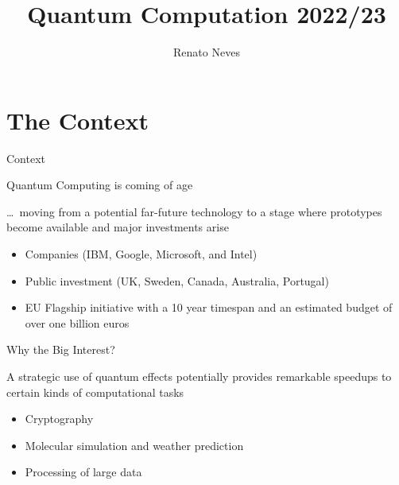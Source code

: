 \documentclass{beamer}
\author[Renato Neves]{Renato Neves}
\date{}
\begin{document}
\title{Quantum Computation 2022/23}

\frame[plain]{\titlepage}

\section{The Context}

\begin{frame}{Context}

  Quantum Computing is coming of age

  \dots\ moving from a potential far-future technology
  to a stage where prototypes become available and
  \alert{major investments} arise
  \begin{itemize}
  \item Companies (IBM, Google, Microsoft, and Intel)
  \item Public investment (UK, Sweden, Canada, Australia, Portugal)
  \item EU Flagship initiative with a 10 year timespan and an
  estimated budget of over one billion euros
  \end{itemize}
\end{frame}

\begin{frame}{Why the Big Interest?}
        
  A strategic use of quantum effects potentially provides remarkable speedups
  to certain kinds of \alert{computational tasks} 

  \begin{itemize}
  \item Cryptography
  \item Molecular simulation and weather prediction
  \item Processing of large data
  \end{itemize}

\end{frame}
\end{document}
